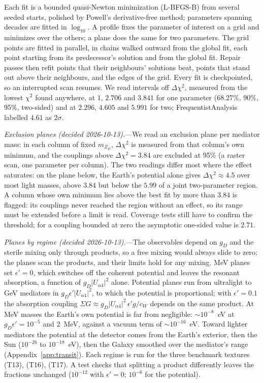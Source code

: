 \documentclass[11pt,a4paper]{article}
\newcommand{\mzd}{m_{Z_D}}
\newcommand{\gd}{g_D}
\newcommand{\epsp}{\epsilon'}
\begin{document}
Each fit is a bounded quasi-Newton minimization (L-BFGS-B) from several seeded starts, polished
by Powell's derivative-free method; parameters spanning decades are fitted in $\log_{10}$. A
profile fixes the parameter of interest on a grid and minimizes over the others; a plane does
the same for two parameters. The grid points are fitted in parallel, in chains walked outward
from the global fit, each point starting from its predecessor's solution and from the global
fit. Repair passes then refit points that their neighbours' solutions beat, points that stand
out above their neighbours, and the edges of the grid. Every fit is checkpointed, so an
interrupted scan resumes. We read intervals off $\Delta\chi^2$, measured from the lowest $\chi^2$
found anywhere, at $1$, $2.706$ and $3.841$ for one parameter (68.27\%, 90\%, 95\%, two-sided)
and at $2.296$, $4.605$ and $5.991$ for two; FrequentistAnalysis labelled $4.61$ as $2\sigma$.

\textit{Exclusion planes (decided 2026-10-13).}---We read an exclusion plane per mediator mass:
in each column of fixed $\mzd$, $\Delta\chi^2$ is measured from that column's own minimum, and the
couplings above $\Delta\chi^2 = 3.84$ are excluded at 95\% (a raster scan, one parameter per
column). The two readings differ most where the effect saturates: on the plane below, the Earth's
potential alone gives $\Delta\chi^2\approx4.5$ over most light masses, above $3.84$ but below the
$5.99$ of a joint two-parameter region. A column whose own minimum lies above the best fit by more
than $3.84$ is flagged: its couplings never reached the region without an effect, so its range
must be extended before a limit is read. Coverage tests still have to confirm the threshold; for
a coupling bounded at zero the asymptotic one-sided value is $2.71$.

\textit{Planes by regime (decided 2026-10-13).}---The observables depend on $\gd$ and the sterile
mixing only through products, so a free mixing would always slide to zero; the planes scan the
products, and their limits hold for any mixing. MeV planes set $\epsp = 0$, which switches off the
coherent potential and leaves the resonant absorption, a function of $\gd|U_{\alpha4}|^2$ alone.
Potential planes run from ultralight to GeV mediators in $\gd\epsp|U_{\alpha4}|^2$, to which the
potential is proportional; with $\epsp = 0.1$ the absorption coupling
$\Sigma G\approx\gd|U_{\alpha4}|^2\,\epsp g/c_W$ depends on the same product. At MeV masses the
Earth's own potential is far from negligible: $\sim10^{-8}$~eV at $\gd\epsp = 10^{-5}$ and
$2$~MeV, against a vacuum term of $\sim10^{-16}$~eV. Toward lighter mediators the potential at
the detector comes from the Earth's exterior, then the Sun ($10^{-26}$ to $10^{-18}$~eV), then the
Galaxy smoothed over the mediator's range (Appendix~\ref{app:transit}). Each regime is run for the three benchmark
textures (T13), (T16), (T17). A test checks that splitting a product differently leaves the
fractions unchanged ($10^{-12}$ with $\epsp = 0$; $10^{-6}$ for the potential).
\end{document}
